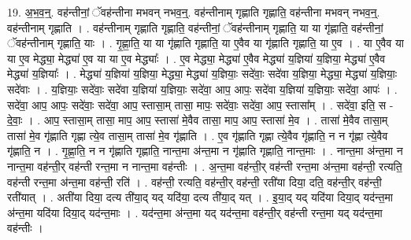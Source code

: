 \documentclass[17pt]{extarticle}
\begin{document}
19. अ॒भ॒व॒न्॒. वह॑न्तीनां॒ ॅवह॑न्तीना मभवन् नभव॒न्॒. वह॑न्तीनाम् गृह्णाति गृह्णाति॒ वह॑न्तीना मभवन् नभव॒न्॒. वह॑न्तीनाम् गृह्णाति । . वह॑न्तीनाम् गृह्णाति गृह्णाति॒ वह॑न्तीनां॒ ॅवह॑न्तीनाम् गृह्णाति॒ या या गृ॑ह्णाति॒ वह॑न्तीनां॒ ॅवह॑न्तीनाम् गृह्णाति॒ याः । . गृ॒ह्णा॒ति॒ या या गृ॑ह्णाति गृह्णाति॒ या ए॒वैव या गृ॑ह्णाति गृह्णाति॒ या ए॒व । . या ए॒वैव या या ए॒व मेद्ध्या॒ मेद्ध्या॑ ए॒व या या ए॒व मेद्ध्याः᳚ । . ए॒व मेद्ध्या॒ मेद्ध्या॑ ए॒वैव मेद्ध्या॑ य॒ज्ञिया॑ य॒ज्ञिया॒ मेद्ध्या॑ ए॒वैव मेद्ध्या॑ य॒ज्ञियाः᳚ । . मेद्ध्या॑ य॒ज्ञिया॑ य॒ज्ञिया॒ मेद्ध्या॒ मेद्ध्या॑ य॒ज्ञियाः॒ सदे॑वाः॒ सदे॑वा य॒ज्ञिया॒ मेद्ध्या॒ मेद्ध्या॑ य॒ज्ञियाः॒ सदे॑वाः । . य॒ज्ञियाः॒ सदे॑वाः॒ सदे॑वा य॒ज्ञिया॑ य॒ज्ञियाः॒ सदे॑वा॒ आप॒ आपः॒ सदे॑वा य॒ज्ञिया॑ य॒ज्ञियाः॒ सदे॑वा॒ आपः॑ । . सदे॑वा॒ आप॒ आपः॒ सदे॑वाः॒ सदे॑वा॒ आप॒ स्तासा॒म् तासा॒ मापः॒ सदे॑वाः॒ सदे॑वा॒ आप॒ स्तासा᳚म् । . सदे॑वा॒ इति॒ स - दे॒वाः॒ । . आप॒ स्तासा॒म् तासा॒ माप॒ आप॒ स्तासा॑ मे॒वैव तासा॒ माप॒ आप॒ स्तासा॑ मे॒व । . तासा॑ मे॒वैव तासा॒म् तासा॑ मे॒व गृ॑ह्णाति गृह्णा त्ये॒व तासा॒म् तासा॑ मे॒व गृ॑ह्णाति । . ए॒व गृ॑ह्णाति गृह्णा त्ये॒वैव गृ॑ह्णाति॒ न न गृ॑ह्णा त्ये॒वैव गृ॑ह्णाति॒ न । . गृ॒ह्णा॒ति॒ न न गृ॑ह्णाति गृह्णाति॒ नान्त॒मा अ॑न्त॒मा न गृ॑ह्णाति गृह्णाति॒ नान्त॒माः । . नान्त॒मा अ॑न्त॒मा न नान्त॒मा वह॑न्ती॒र् वह॑न्ती रन्त॒मा न नान्त॒मा वह॑न्तीः । . अ॒न्त॒मा वह॑न्ती॒र् वह॑न्ती रन्त॒मा अ॑न्त॒मा वह॑न्ती॒ रत्यति॒ वह॑न्ती रन्त॒मा अ॑न्त॒मा वह॑न्ती॒ रति॑ । . वह॑न्ती॒ रत्यति॒ वह॑न्ती॒र् वह॑न्ती॒ रती॑या दिया॒ दति॒ वह॑न्ती॒र् वह॑न्ती॒ रती॑यात् । . अती॑या दिया॒ दत्य ती॑या॒द् यद् यदि॑या॒ दत्य ती॑या॒द् यत् । . इ॒या॒द् यद् यदि॑या दिया॒द् यद॑न्त॒मा अ॑न्त॒मा यदि॑या दिया॒द् यद॑न्त॒माः । . यद॑न्त॒मा अ॑न्त॒मा यद् यद॑न्त॒मा वह॑न्ती॒र् वह॑न्ती रन्त॒मा यद् यद॑न्त॒मा वह॑न्तीः । \newline
\end{document}
